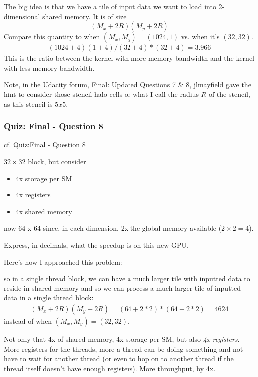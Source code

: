 \documentclass[10pt]{amsart}
\begin{document}
\begin{multicols*}{2}
The big idea is that we have a tile of input data we want to load into 2-dimensional shared memory.  It is of size
\begin{equation}
  (M_x + 2R) (M_y + 2R)
\end{equation}
Compare this quantity to when $(M_x,M_y) = (1024,1)$ vs. when it's $(32,32)$.
\[
\begin{gathered}
  (1024 +4 )(1+4) / (32 +4)*(32 +4) = \boxed{ 3.966 }
  \end{gathered}
\]
This is the ratio between the kernel with more memory bandwidth and the kernel with less memory bandwidth.  

Note, in the Udacity forum, \href{https://discussions.udacity.com/t/final-updated-questions-7-8/88801/2}{Final: Updated Questions 7 \& 8}, jlmayfield gave the hint to consider those stencil halo cells or what I call the radius $R$ of the stencil, as this stencil is $5x5$.    

\subsubsection{Quiz: Final - Question 8}

cf. \href{https://classroom.udacity.com/courses/cs344/lessons/2133758814/concepts/1421890280923}{Quiz:Final - Question 8}

$32 \times 32 $ block, but consider
\begin{itemize}
\item 4x storage per SM
\item 4x registers
\item 4x shared memory
  \end{itemize}
now 64 x 64 since, in each dimension, 2x the global memory available ($2\times 2 = 4$).  

Express, in decimals, what the speedup is on this new GPU.

Here's how I approached this problem:  

so in a single thread block, we can have a much larger tile with inputted data to reside in shared memory and so we can process a much larger tile of inputted data in a single thread block:
\begin{equation}
\begin{gathered}
  (M_x + 2R)(M_y + 2R) = ( 64 + 2*2)*(64 + 2*2) = 4624
\end{gathered}
\end{equation}
instead of when $(M_x,M_y)=(32,32)$.

Not only that 4x of shared memory, 4x storage per SM, but also \emph{4x registers}.  More registers for the threads, more a thread can be doing something and not have to wait for another thread (or even to hop on to another thread if the thread itself doesn't have enough registers).  More throughput, by 4x.


\end{multicols*}
\end{document}
